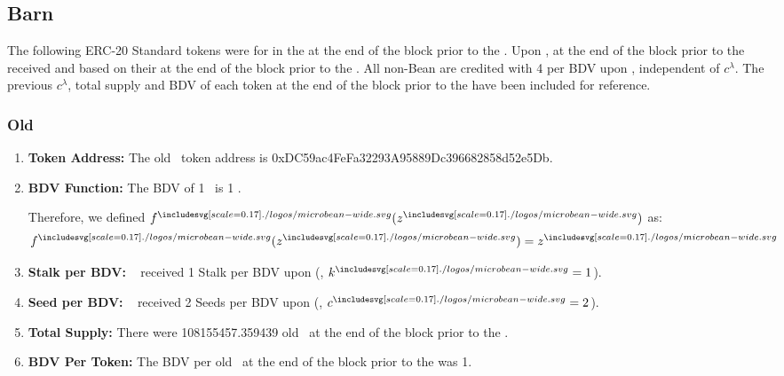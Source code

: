 \documentclass[class=article, crop=false]{standalone}
\begin{document}
\subsection{Barn}
\vspace*{-1.5mm}
The following ERC-20 Standard tokens were  for  in the  at the end of the block prior to the . Upon ,  at the end of the block prior to the  received  and  based on their  at the end of the block prior to the . All non-Bean  are credited with 4  per BDV upon , independent of \hyperlink{ht32}{$c^{\lambda}$}. The previous \hyperlink{ht32}{$c^{\lambda}$}, total supply and BDV of each token at the end of the block prior to the  have been included for reference. 

\vspace*{-1.5mm}
\subsubsection{Old \Bean}
\vspace*{-1.5mm}
\begin{enumerate}
        \item \textbf{Token Address:} The old \Bean\ token address is 0xDC59ac4FeFa32293A95889Dc396682858d52e5Db.
        \item \textbf{BDV Function:} The BDV of 1 \Bean\ is 1 \Bean. 
        
Therefore, we defined $f^{\bean}(z^{\bean})$ as:
            $$f^{\bean}(z^{\bean}) = z^{\bean}$$
        \item \textbf{Stalk per BDV:} \Bean\  received 1 Stalk per BDV upon  (, $k^{\bean} = 1$).
        \item \textbf{Seed per BDV:} \Bean\  received 2 Seeds per BDV upon  (, $c^{\bean} = 2$).
        \item \textbf{Total Supply:} There were 108155457.359439 old \Bean\ at the end of the block prior to the .
        \item \textbf{BDV Per Token:} The BDV per old \Bean\ at the end of the block prior to the  was 1.
    \end{enumerate}

\vspace{-1.5mm}
\end{document}
